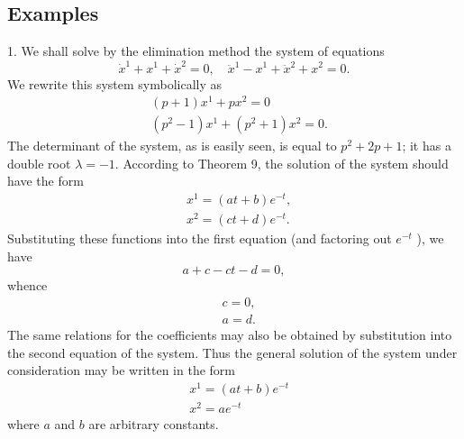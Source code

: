 \documentclass[10pt,a5paper]{book}
\theoremstyle{plain}
\theoremstyle{definition}
\theoremstyle{remark}
\begin{document}
\subsection*{Examples}
1. We shall solve by the elimination method the system of equations
\[
\dot{x}^{1}+x^{1}+\dot{x}^{2}=0, \quad \ddot{x}^{1}-x^{1}+\ddot{x}^{2}+x^{2}=0 .
\]
We rewrite this system symbolically as
\[
\begin{aligned}
& (p+1) x^{1}+p x^{2}=0 \\
& \left(p^{2}-1\right) x^{1}+\left(p^{2}+1\right) x^{2}=0 .
\end{aligned}
\]
The determinant of the system, as is easily seen, is equal to $p^{2}+2 p+1$; it has a double root $\lambda=-1$. According to Theorem 9, the solution of the system should have the form
\[
\begin{aligned}
& x^{1}=(a t+b) e^{-t}, \\
& x^{2}=(c t+d) e^{-t} .
\end{aligned}
\]
Substituting these functions into the first equation (and factoring out $e^{-t}$ ), we have
\[
a+c-c t-d=0,
\]
whence
\[
\begin{aligned}
& c=0, \\
& a=d .
\end{aligned}
\]
The same relations for the coefficients may also be obtained by substitution into the second equation of the system. Thus the general solution of the system under consideration may be written in the form
\[
\begin{aligned}
& x^{1}=(a t+b) e^{-t} \\
& x^{2}=a e^{-t}
\end{aligned}
\]
where $a$ and $b$ are arbitrary constants.
\end{document}
